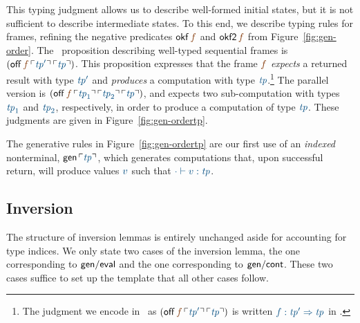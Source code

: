 This typing judgment allows us to describe well-formed initial states,
but it is not sufficient to describe intermediate states. To this end,
we describe typing rules for frames, refining the negative predicates
${\sf okf}\,\lf{f}$ and ${\sf okf2}\,\lf{f}$ from
Figure~\ref{fig:gen-order}. The \sls~proposition describing well-typed
sequential frames is $({\sf off}\,\lf{f}\,\interp{{\it
    tp}'}\,\interp{\it tp})$. This proposition expresses that the frame
$\lf{f}$ {\it expects} a returned result with type $\obj{\it tp'}$ and
{\it produces} a computation with type $\obj{{\it tp}}$.\footnote{The
  judgment we encode in \sls~as $({\sf off}\,\lf{f}\,\interp{{\it
      tp}'}\,\interp{\it tp})$ is written $\obj{f : {\it tp}'
    \Rightarrow {\it tp}}$ in \cite[Chapter 27]{harper12practical}.}
The parallel version is $({\sf off}\,\lf{f}\,\interp{{\it
    tp}_1}\,\interp{{\it tp}_2}\,\interp{\it tp})$, and expects two
sub-computation with types $\obj{{\it tp}_1}$ and $\obj{{\it tp}_2}$,
respectively, in order to produce a computation of type $\obj{{\it
    tp}}$. These judgments are given in Figure~\ref{fig:gen-ordertp}. 

The generative rules in Figure~\ref{fig:gen-ordertp} are our first use
of an {\it indexed} nonterminal, ${\sf gen}\,\interp{\it tp}$, which
generates computations that, upon successful return, will produce
values $\obj{v}$ such that $\obj{\cdot \vdash v : {\it tp}}$. 

\subsection{Inversion}

The structure of inversion lemmas is entirely unchanged
aside for accounting for type indices. We only state
two cases of the inversion lemma, the one corresponding to 
${\sf gen/eval}$ and the one corresponding to ${\sf gen/cont}$. 
These two cases suffice to set up the template that all other cases
follow. 

